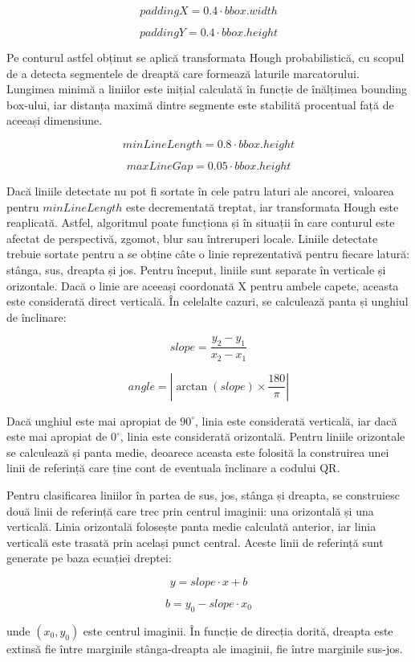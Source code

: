 \[
    paddingX = 0.4 \cdot bbox.width
\]

\[
    paddingY = 0.4 \cdot bbox.height
\]

Pe conturul astfel obținut se aplică transformata Hough probabilistică, cu scopul de a detecta segmentele de dreaptă care formează laturile marcatorului. Lungimea minimă a liniilor este inițial calculată în funcție de înălțimea bounding box-ului, iar distanța maximă dintre segmente este stabilită procentual față de aceeași dimensiune.

\[
    minLineLength = 0.8 \cdot bbox.height
\]

\[
    maxLineGap = 0.05 \cdot bbox.height
\]

Dacă liniile detectate nu pot fi sortate în cele patru laturi ale ancorei, valoarea pentru $minLineLength$ este decrementată treptat, iar transformata Hough este reaplicată. Astfel, algoritmul poate funcționa și în situații în care conturul este afectat de perspectivă, zgomot, blur sau întreruperi locale.
Liniile detectate trebuie sortate pentru a se obține câte o linie reprezentativă pentru fiecare latură: stânga, sus, dreapta și jos. Pentru început, liniile sunt separate în verticale și orizontale. Dacă o linie are aceeași coordonată X pentru ambele capete, aceasta este considerată direct verticală. În celelalte cazuri, se calculează panta și unghiul de înclinare:

\[
    slope = \frac{y_2 - y_1}{x_2 - x_1}
\]

\[
    angle = \left| \arctan(slope) \times \frac{180}{\pi} \right|
\]

Dacă unghiul este mai apropiat de $90^\circ$, linia este considerată verticală, iar dacă este mai apropiat de $0^\circ$, linia este considerată orizontală. Pentru liniile orizontale se calculează și panta medie, deoarece aceasta este folosită la construirea unei linii de referință care ține cont de eventuala înclinare a codului QR.

Pentru clasificarea liniilor în partea de sus, jos, stânga și dreapta, se construiesc două linii de referință care trec prin centrul imaginii: una orizontală și una verticală. Linia orizontală folosește panta medie calculată anterior, iar linia verticală este trasată prin același punct central. Aceste linii de referință sunt generate pe baza ecuației dreptei:

\[
    y = slope \cdot x + b
\]

\[
    b = y_0 - slope \cdot x_0
\]

unde $(x_0, y_0)$ este centrul imaginii. În funcție de direcția dorită, dreapta este extinsă fie între marginile stânga-dreapta ale imaginii, fie între marginile sus-jos.


